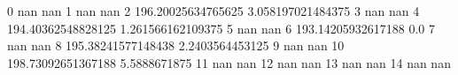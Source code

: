 0 nan nan
1 nan nan
2 196.20025634765625 3.058197021484375
3 nan nan
4 194.40362548828125 1.261566162109375
5 nan nan
6 193.14205932617188 0.0
7 nan nan
8 195.38241577148438 2.2403564453125
9 nan nan
10 198.73092651367188 5.5888671875
11 nan nan
12 nan nan
13 nan nan
14 nan nan
